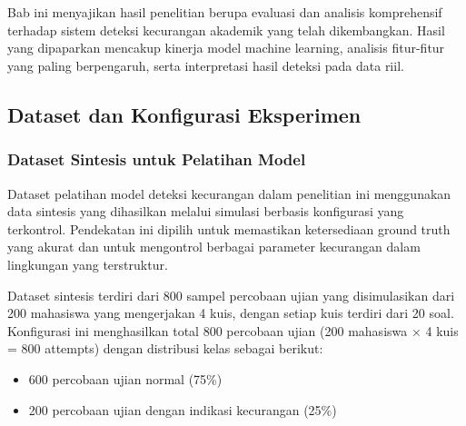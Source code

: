 
\chapter{\babEmpat}
\label{bab:4}

Bab ini menyajikan hasil penelitian berupa evaluasi dan analisis komprehensif terhadap sistem deteksi kecurangan akademik yang telah dikembangkan. Hasil yang dipaparkan mencakup kinerja model machine learning, analisis fitur-fitur yang paling berpengaruh, serta interpretasi hasil deteksi pada data riil.

\section{Dataset dan Konfigurasi Eksperimen}
\label{sec:datasetKonfigurasi}

\subsection{Dataset Sintesis untuk Pelatihan Model}
\label{subsec:datasetSintesis}

Dataset pelatihan model deteksi kecurangan dalam penelitian ini menggunakan data sintesis yang dihasilkan melalui simulasi berbasis konfigurasi yang terkontrol. Pendekatan ini dipilih untuk memastikan ketersediaan ground truth yang akurat dan untuk mengontrol berbagai parameter kecurangan dalam lingkungan yang terstruktur.

Dataset sintesis terdiri dari 800 sampel percobaan ujian yang disimulasikan dari 200 mahasiswa yang mengerjakan 4 kuis, dengan setiap kuis terdiri dari 20 soal. Konfigurasi ini menghasilkan total 800 percobaan ujian (200 mahasiswa × 4 kuis = 800 attempts) dengan distribusi kelas sebagai berikut:
\begin{itemize}
    \item 600 percobaan ujian normal (75\%)
    \item 200 percobaan ujian dengan indikasi kecurangan (25\%)
\end{itemize}

